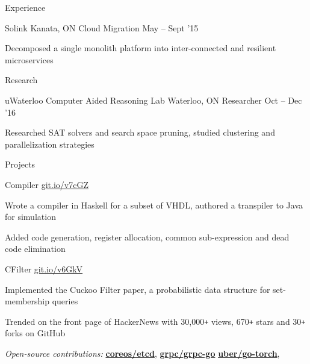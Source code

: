 \documentclass{resume} %
\begin{document}
\begin{rSection}{Experience}
  \begin{rSubsection}{Solink}
                     {Kanata, ON}
                     {Cloud Migration}
                     {May -- Sept '15}

   \item Decomposed a single monolith platform into inter-connected and
      resilient microservices
  \end{rSubsection}
\end{rSection}


\begin{rSection}{Research}
  \begin{rSubsection}{uWaterloo Computer Aided Reasoning Lab}
                     {Waterloo, ON}
                     {Researcher}
                     {Oct -- Dec '16}
   \item Researched SAT solvers and search space pruning, studied clustering and
     parallelization strategies
  \end{rSubsection}
\end{rSection}


\begin{rSection}{Projects}
  \begin{rSubsection}{Compiler}
                     {\href{https://git.io/v7cGZ}{git.io/v7cGZ}}
                     {}{}
   \item Wrote a compiler in Haskell for a subset of VHDL, authored a
     transpiler to Java for simulation
   \item Added code generation, register allocation, common sub-expression and
     dead code elimination
  \end{rSubsection}

  \begin{rSubsection}{CFilter}
    {\href{https://git.io/v6GkV}{git.io/v6GkV}}
                     {}{}
     \item Implemented the Cuckoo Filter paper, a probabilistic data structure for
       set-membership queries
     \item Trended on the front page of HackerNews with 30,000\texttt{+} views,
       670\texttt{+} stars and 30\texttt{+} forks on GitHub
  \end{rSubsection}

  \begin{rMinisection}
    \item {\em Open-source contributions:}
      \href{https://github.com/coreos/etcd}{\textbf{coreos/etcd}},
      \href{https://github.com/grpc/grpc-go}{\textbf{grpc/grpc-go}}
      \href{https://github.com/uber/go-torch}{\textbf{uber/go-torch}},
  \end{rMinisection}
\end{rSection}
\end{document}
